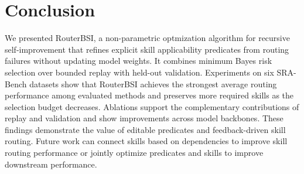 
\section{Conclusion}

We presented RouterBSI, a non-parametric optmization algorithm for recursive self-improvement that refines explicit skill applicability predicates from routing failures without updating model weights. It combines minimum Bayes risk selection over bounded replay with held-out validation. Experiments on six SRA-Bench datasets show that RouterBSI achieves the strongest average routing performance among evaluated methods and preserves more required skills as the selection budget decreases. Ablations support the complementary contributions of replay and validation and show improvements across model backbones. These findings demonstrate the value of editable predicates and feedback-driven skill routing. Future work can connect skills based on dependencies to improve skill routing performance or jointly optimize predicates and skills to improve downstream performance.
